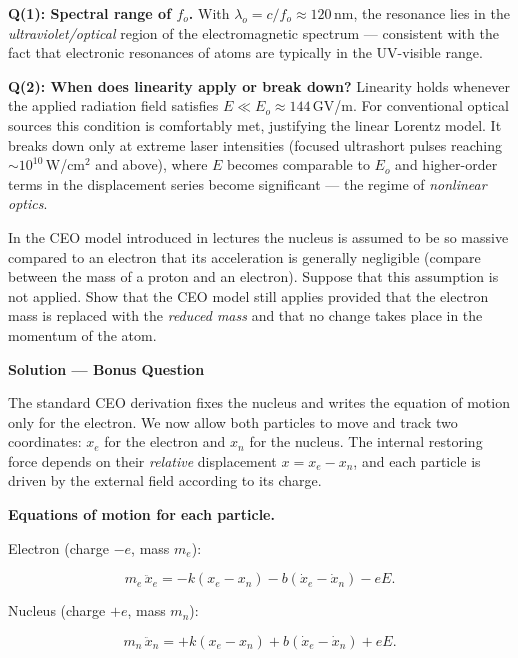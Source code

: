 \textbf{Q(1): Spectral range of $f_o$.} With $\lambda_o = c/f_o \approx 120$\,nm, the resonance lies in the \emph{ultraviolet/optical} region of the electromagnetic spectrum --- consistent with the fact that electronic resonances of atoms are typically in the UV-visible range.

\textbf{Q(2): When does linearity apply or break down?} Linearity holds whenever the applied radiation field satisfies $E \ll E_o \approx 144$\,GV/m. For conventional optical sources this condition is comfortably met, justifying the linear Lorentz model. It breaks down only at extreme laser intensities (focused ultrashort pulses reaching $\sim10^{10}$\,W/cm$^2$ and above), where $E$ becomes comparable to $E_o$ and higher-order terms in the displacement series become significant --- the regime of \emph{nonlinear optics}.


\begin{question}In the CEO model introduced in lectures the nucleus is assumed to be so
massive compared to an electron that its acceleration is generally negligible (compare between the
mass of a proton and an electron). Suppose that this assumption is not applied. Show that the CEO
model still applies provided that the electron mass is replaced with the \emph{reduced mass} and
that no change takes place in the momentum of the atom.
\end{question}

\textbf{\large Solution --- Bonus Question}

The standard CEO derivation fixes the nucleus and writes the equation of motion only for the electron. We now allow both particles to move and track two coordinates: $x_e$ for the electron and $x_n$ for the nucleus. The internal restoring force depends on their \emph{relative} displacement $x = x_e - x_n$, and each particle is driven by the external field according to its charge.

\textbf{Equations of motion for each particle.}

Electron (charge $-e$, mass $m_e$):

\begin{equation*}
  m_e\,\ddot{x}_e = -k(x_e - x_n) - b(\dot{x}_e - \dot{x}_n) - eE.
\end{equation*}

Nucleus (charge $+e$, mass $m_n$):

\begin{equation*}
  m_n\,\ddot{x}_n = +k(x_e - x_n) + b(\dot{x}_e - \dot{x}_n) + eE.
\end{equation*}

